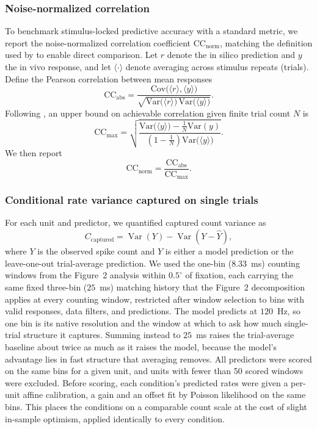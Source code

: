 \documentclass{lite}
\begin{document}
\subsubsection{Noise-normalized correlation}
To benchmark stimulus-locked predictive accuracy with a standard metric, we report the noise-normalized correlation coefficient $\mathrm{CC}_{\mathrm{norm}}$, matching the definition used by \cite{wang2025foundation} to enable direct comparison. Let $r$ denote the in silico prediction and $y$ the in vivo response, and let $\langle \cdot \rangle$ denote averaging across stimulus repeats (trials). Define the Pearson correlation between mean responses
\begin{equation}
\mathrm{CC}_{\mathrm{abs}}
=
\frac{\mathrm{Cov}\!\big(\langle r \rangle,\langle y \rangle\big)}
{\sqrt{\mathrm{Var}\!\big(\langle r \rangle\big)\,\mathrm{Var}\!\big(\langle y \rangle\big)}}.
\end{equation}
Following \cite{schoppe2016measuring}, an upper bound on achievable correlation given finite trial count $N$ is
\begin{equation}
\mathrm{CC}_{\max}
=
\sqrt{
\frac{\mathrm{Var}\!\big(\langle y \rangle\big)-\frac{1}{N}\mathrm{Var}(y)}
{\left(1-\frac{1}{N}\right)\mathrm{Var}\!\big(\langle y \rangle\big)}
}.
\end{equation}
We then report
\begin{equation}
\mathrm{CC}_{\mathrm{norm}}
=
\frac{\mathrm{CC}_{\mathrm{abs}}}{\mathrm{CC}_{\max}}.
\end{equation}

\subsubsection{Conditional rate variance captured on single trials}
For each unit and predictor, we quantified captured count variance as
\begin{equation}
C_{\mathrm{captured}}
=
\operatorname{Var}(Y)-\operatorname{Var}(Y-\hat{Y}),
\end{equation}
where $Y$ is the observed spike count and $\hat{Y}$ is either a model prediction or the leave-one-out trial-average prediction. We used the one-bin ($8.33$~ms) counting windows from the Figure~2 analysis within $0.5^\circ$ of fixation, each carrying the same fixed three-bin ($25$~ms) matching history that the Figure~2 decomposition applies at every counting window, restricted after window selection to bins with valid responses, data filters, and predictions. The model predicts at $120$~Hz, so one bin is its native resolution and the window at which to ask how much single-trial structure it captures. Summing instead to $25$~ms raises the trial-average baseline about twice as much as it raises the model, because the model's advantage lies in fast structure that averaging removes. All predictors were scored on the same bins for a given unit, and units with fewer than 50 scored windows were excluded. Before scoring, each condition's predicted rates were given a per-unit affine calibration, a gain and an offset fit by Poisson likelihood on the same bins. This places the conditions on a comparable count scale at the cost of slight in-sample optimism, applied identically to every condition.
\end{document}
